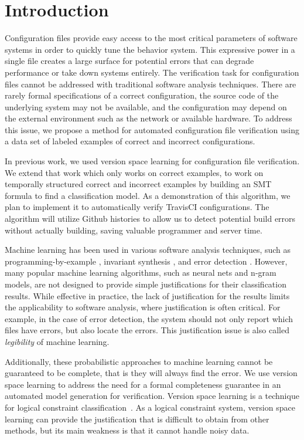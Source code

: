 \section{Introduction}

Configuration files provide easy access to the most critical parameters of software systems in order to quickly tune the behavior system.
This expressive power in a single file creates a large surface for potential errors that can degrade performance or take down systems entirely.
The verification task for configuration files cannot be addressed with traditional software analysis techniques.
There are rarely formal specifications of a correct configuration, 
  the source code of the underlying system may not be available, 
  and the configuration may depend on the external environment such as the network or available hardware.
To address this issue, we propose a method for automated configuration file verification using a data set of labeled examples of correct and incorrect configurations.

In previous work, we used version space learning for configuration file verification.
We extend that work which only works on correct examples, to work on temporally structured correct and incorrect examples by building an SMT formula to find a classification model.
As a demonstration of this algorithm, we plan to implement it to automatically verify TravisCI configurations.
The algorithm will utilize Github histories to allow us to detect potential build errors without actually building, saving valuable programmer and server time.

Machine learning has been used in various software analysis techniques, such as programming-by-example \cite{lau2000version}, invariant synthesis \cite{garg2014ice}, and error detection \cite{Santolucito2016}.
However, many popular machine learning algorithms, such as neural nets and n-gram models, are not designed to provide simple justifications for their classification results.
While effective in practice, the lack of justification for the results limits the applicability to software analysis, where justification is often critical.
For example, in the case of error detection, the system should not only report which files have errors, but also locate the errors.
This justification issue is also called \textit{legibility} of machine learning.

Additionally, these probabilistic approaches to machine learning cannot be guaranteed to be complete, that is they will always find the error.
We use version space learning to address the need for a formal completeness guarantee in an automated model generation for verification.
Version space learning is a technique for logical constraint classification~\cite{mitchell82}.
As a logical constraint system, version space learning can provide the justification that is difficult to obtain from other methods, but its main weakness is that it cannot handle noisy data.

